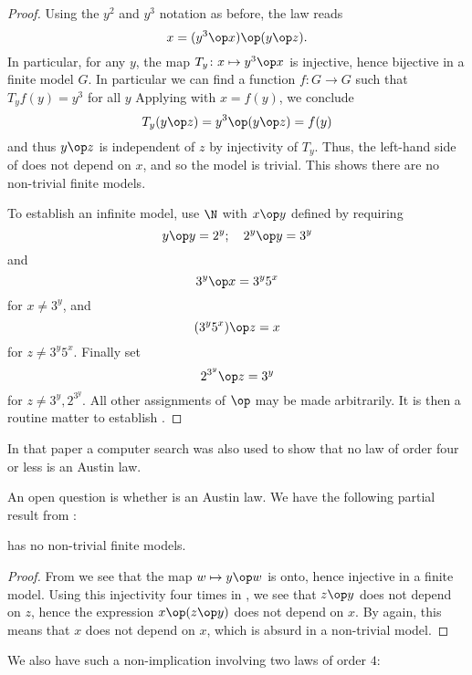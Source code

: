 \begin{proof} \leanok Using the $y^2$ and $y^3$ notation as before, the law reads
\begin{equation}\label{kis2-law}
   x = (y^3 \op x) \op (y \op z).
  \end{equation}
In particular, for any $y$, the map $T_y \colon x \mapsto y^3 \op x$ is injective, hence bijective in a finite model $G$.  In particular we can find a function $f : G \to G$ such that $T_y f(y) = y^3$ for all $y$  Applying  with $x = f(y)$, we conclude
$$ T_y(y \op z) = y^3 \op (y \op z) = f(y) $$
and thus $y \op z$ is independent of $z$ by injectivity of $T_y$.  Thus, the left-hand side of  does not depend on $x$, and so the model is trivial.  This shows there are no non-trivial finite models.

To establish an infinite model, use $\N$ with $x \op y$ defined by requiring
$$ y \op y = 2^y; \quad 2^y \op y = 3^y$$
and
$$ 3^y \op x = 3^y 5^x$$
for $x \neq 3^y$, and
$$ (3^y 5^x) \op z = x$$
for $z \neq 3^y 5^x$.  Finally set
$$ 2^{3^y} \op z = 3^y$$
for $z \neq 3^y, 2^{3^y}$.  All other assignments of $\op$ may be made arbitrarily. It is then a routine matter to establish .
\end{proof}

In that paper a computer search was also used to show that no law of order four or less is an Austin law.

An open question is whether  is an Austin law.  We have the following partial result from \cite{Kisielewicz2}:

\begin{theorem}\leanok\label{5093-nontrivial}  has no non-trivial finite models.
\end{theorem}

\begin{proof} \leanok From  we see that the map $w \mapsto y \op w$ is onto, hence injective in a finite model.  Using this injectivity four times in , we see that $z \op y$ does not depend on $z$, hence the expression
$x \op (z \op y)$ does not depend on $x$.  By  again, this means that $x$ does not depend on $x$, which is absurd in a non-trivial model.
\end{proof}

We also have such a non-implication involving two laws of order $4$:


